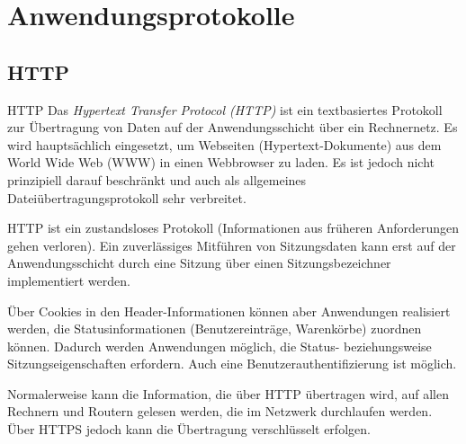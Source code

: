 \section{Anwendungsprotokolle}

\subsection{HTTP}

\begin{defi}{HTTP}
    Das \emph{Hypertext Transfer Protocol (HTTP)} ist ein textbasiertes Protokoll zur Übertragung von Daten auf der Anwendungsschicht über ein Rechnernetz.
    Es wird hauptsächlich eingesetzt, um Webseiten (Hypertext-Dokumente) aus dem World Wide Web (WWW) in einen Webbrowser zu laden.
    Es ist jedoch nicht prinzipiell darauf beschränkt und auch als allgemeines Dateiübertragungsprotokoll sehr verbreitet.

    HTTP ist ein zustandsloses Protokoll (Informationen aus früheren Anforderungen gehen verloren).
    Ein zuverlässiges Mitführen von Sitzungsdaten kann erst auf der Anwendungsschicht durch eine Sitzung über einen Sitzungsbezeichner implementiert werden.

    Über Cookies in den Header-Informationen können aber Anwendungen realisiert werden, die Statusinformationen (Benutzereinträge, Warenkörbe) zuordnen können.
    Dadurch werden Anwendungen möglich, die Status- beziehungsweise Sitzungseigenschaften erfordern.
    Auch eine Benutzerauthentifizierung ist möglich.

    Normalerweise kann die Information, die über HTTP übertragen wird, auf allen Rechnern und Routern gelesen werden, die im Netzwerk durchlaufen werden.
    Über HTTPS jedoch kann die Übertragung verschlüsselt erfolgen.
\end{defi}

